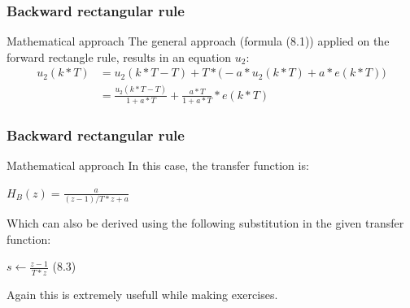 \begin{frame}
	\frametitle{Backward rectangular rule}	
	\begin{block}{Mathematical approach}
		The general approach (formula (8.1)) applied on the forward rectangle rule, results in an equation $u_2$:
		\begin{align*}
		u_2(k*T)& =u_2(k*T - T) + T*\big(-a*u_2(k*T) + a*e(k*T) \big)\\
		& =\frac{u_2(k*T - T)}{1 + a*T} + \frac{a*T}{1 + a*T}*e(k*T)
		\end{align*}
	\end{block}
\end{frame}

\begin{frame}
	\frametitle{Backward rectangular rule}
	\begin{block}{Mathematical approach}
		In this case, the transfer function is:
		\begin{center}
			$H_B(z) = \frac{a}{(z-1)/T*z+a}$
		\end{center}
		Which can also be derived using the following substitution in the given transfer function:
		\begin{center}
			$s \gets \frac{z-1}{T*z}$ (8.3)
		\end{center}
		Again this is extremely usefull while making exercises.
	\end{block}
\end{frame}

